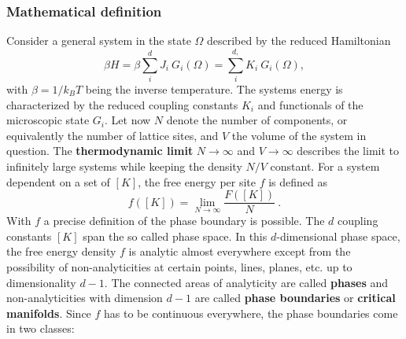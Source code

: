 	\subsubsection{Mathematical definition}
	Consider a general system in the state $\Omega$ described by the reduced Hamiltonian
	\begin{equation} \label{Eq::General-Hamiltonian}
		\beta H =	\beta \sum_{i}^{d} J_i~ G_i(\Omega) =	\sum_{i}^{d,} K_i ~ G_i(\Omega),
	\end{equation}
	with $\beta =	1 /	k_B T$ being the inverse temperature. The systems energy is characterized by the reduced coupling constants $K_i$ and functionals of the microscopic state $G_i$.
	Let now $N$ denote the number of components, or equivalently the number of lattice sites, and $V$ the volume of the system in question. The \textbf{thermodynamic limit} $N \rightarrow \infty$ and $V \rightarrow \infty$ describes the limit to infinitely large systems while keeping the density $N/V$ constant. For a system dependent on a set of $[K]$, the free energy per site $f$ is defined as
	\begin{equation}
		f([K]) =	\lim\limits_{N \rightarrow \infty} \frac{F([K])}{N} ~.
	\end{equation}
	With $f$ a precise definition of the phase boundary is possible. The $d$ coupling constants $[K]$ span the so called phase space. In this $d$-dimensional phase space, the free energy density $f$ is analytic almost everywhere except from the possibility of non-analyticities at certain points, lines, planes, etc. up to dimensionality $d-1$. The connected areas of analyticity are called \textbf{phases} and non-analyticities with dimension $d-1$ are called \textbf{phase boundaries} or \textbf{critical manifolds}. Since $f$ has to be continuous everywhere, the phase boundaries come in two classes:
